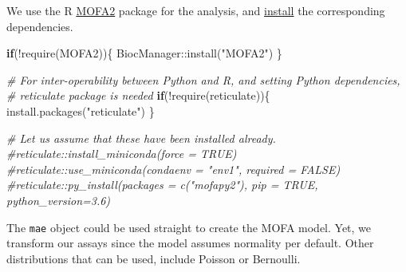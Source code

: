 \documentclass[
]{book}
\newenvironment{Shaded}{\begin{snugshade}}{\end{snugshade}}
\newcommand{\CommentTok}[1]{\textcolor[rgb]{0.56,0.35,0.01}{\textit{#1}}}
\newcommand{\ControlFlowTok}[1]{\textcolor[rgb]{0.13,0.29,0.53}{\textbf{#1}}}
\newcommand{\FunctionTok}[1]{\textcolor[rgb]{0.00,0.00,0.00}{#1}}
\newcommand{\NormalTok}[1]{#1}
\newcommand{\SpecialCharTok}[1]{\textcolor[rgb]{0.00,0.00,0.00}{#1}}
\newcommand{\StringTok}[1]{\textcolor[rgb]{0.31,0.60,0.02}{#1}}
\begin{document}
We use the R \href{https://biofam.github.io/MOFA2/index.html}{MOFA2}
package for the analysis, and
\href{https://biofam.github.io/MOFA2/installation.html}{install} the
corresponding dependencies.

\begin{Shaded}
\begin{Highlighting}[]
\ControlFlowTok{if}\NormalTok{(}\SpecialCharTok{!}\FunctionTok{require}\NormalTok{(MOFA2))\{}
\NormalTok{    BiocManager}\SpecialCharTok{::}\FunctionTok{install}\NormalTok{(}\StringTok{"MOFA2"}\NormalTok{)}
\NormalTok{\}}

\CommentTok{\# For inter{-}operability between Python and R, and setting Python dependencies,}
\CommentTok{\# reticulate package is needed}
\ControlFlowTok{if}\NormalTok{(}\SpecialCharTok{!}\FunctionTok{require}\NormalTok{(reticulate))\{}
    \FunctionTok{install.packages}\NormalTok{(}\StringTok{"reticulate"}\NormalTok{)}
\NormalTok{\}}

\CommentTok{\# Let us assume that these have been installed already.}
\CommentTok{\#reticulate::install\_miniconda(force = TRUE)}
\CommentTok{\#reticulate::use\_miniconda(condaenv = "env1", required = FALSE)}
\CommentTok{\#reticulate::py\_install(packages = c("mofapy2"), pip = TRUE, python\_version=3.6)}
\end{Highlighting}
\end{Shaded}

The \texttt{mae} object could be used straight to create the MOFA model. Yet,
we transform our assays since the model assumes normality per
default. Other distributions that can be used, include Poisson or
Bernoulli.
\end{document}
